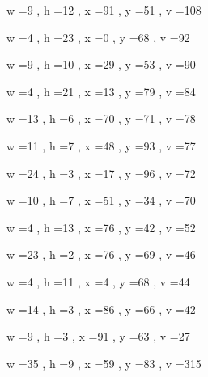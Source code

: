\documentclass[11pt]{article}
\begin{document}
\par
w =9 , h =12 , x =91 , y =51 , v =108
\par
w =4 , h =23 , x =0 , y =68 , v =92
\par
w =9 , h =10 , x =29 , y =53 , v =90
\par
w =4 , h =21 , x =13 , y =79 , v =84
\par
w =13 , h =6 , x =70 , y =71 , v =78
\par
w =11 , h =7 , x =48 , y =93 , v =77
\par
w =24 , h =3 , x =17 , y =96 , v =72
\par
w =10 , h =7 , x =51 , y =34 , v =70
\par
w =4 , h =13 , x =76 , y =42 , v =52
\par
w =23 , h =2 , x =76 , y =69 , v =46
\par
w =4 , h =11 , x =4 , y =68 , v =44
\par
w =14 , h =3 , x =86 , y =66 , v =42
\par
w =9 , h =3 , x =91 , y =63 , v =27
\par
w =35 , h =9 , x =59 , y =83 , v =315
\par
\newpage
\end{document}

